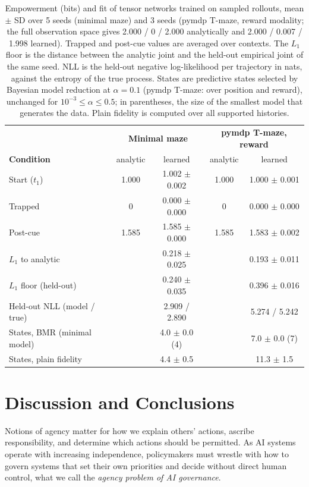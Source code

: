 \documentclass[pdflatex,sn-apa]{sn-jnl}%
\theoremstyle{definition}
\begin{document}
\begin{table}[t]
\centering
{\small
\begin{tabular}{lcccc}
\hline
 & \multicolumn{2}{c}{\textbf{Minimal maze}} & \multicolumn{2}{c}{\textbf{pymdp T-maze, reward}} \\
\textbf{Condition} & analytic & learned & analytic & learned \\
\hline
Start ($t_1$) & 1.000 & 1.002 $\pm$ 0.002 & 1.000 & 1.000 $\pm$ 0.001 \\
Trapped & 0 & 0.000 $\pm$ 0.000 & 0 & 0.000 $\pm$ 0.000 \\
Post-cue & 1.585 & 1.585 $\pm$ 0.000 & 1.585 & 1.583 $\pm$ 0.002 \\
\hline
$L_1$ to analytic & & 0.218 $\pm$ 0.025 & & 0.193 $\pm$ 0.011 \\
$L_1$ floor (held-out) & & 0.240 $\pm$ 0.035 & & 0.396 $\pm$ 0.016 \\
Held-out NLL (model / true) & & 2.909 / 2.890 & & 5.274 / 5.242 \\
States, BMR (minimal model) & & 4.0 $\pm$ 0.0 (4) & & 7.0 $\pm$ 0.0 (7) \\
States, plain fidelity & & 4.4 $\pm$ 0.5 & & 11.3 $\pm$ 1.5 \\
\hline
\end{tabular}
}
\caption{Empowerment (bits) and fit of tensor networks trained on sampled rollouts, mean $\pm$ SD over 5 seeds (minimal maze) and 3 seeds (pymdp T-maze, reward modality; the full observation space gives 2.000 / 0 / 2.000 analytically and 2.000 / 0.007 / 1.998 learned). Trapped and post-cue values are averaged over contexts. The $L_1$ floor is the distance between the analytic joint and the held-out empirical joint of the same seed. NLL is the held-out negative log-likelihood per trajectory in nats, against the entropy of the true process. States are predictive states selected by Bayesian model reduction at $\alpha = 0.1$ (pymdp T-maze: over position and reward), unchanged for $10^{-3} \le \alpha \le 0.5$; in parentheses, the size of the smallest model that generates the data. Plain fidelity is computed over all supported histories.}
\label{tab:learned}
\end{table}

\section{Discussion and Conclusions}\label{sec:discussion}

Notions of agency matter for how we explain others' actions, ascribe responsibility, and determine which actions should be permitted. As AI systems operate with increasing independence, policymakers must wrestle with how to govern systems that set their own priorities and decide without direct human control, what we call the \emph{agency problem of AI governance}.
\end{document}

